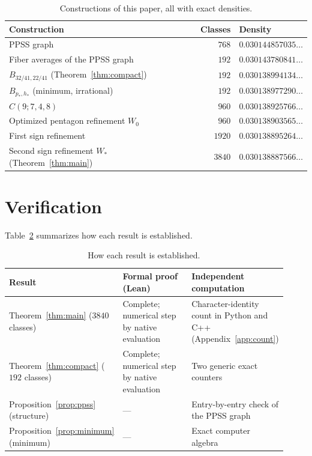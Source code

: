 \documentclass[11pt]{article}
\theoremstyle{definition}
\theoremstyle{remark}
\begin{document}
\begin{table}[tbp]
\centering
\caption{Constructions of this paper, all with exact densities.}
\label{tab:values}
\begin{tabular}{@{}lrl@{}}
\toprule
Construction & Classes & Density\\
\midrule
PPSS graph~\cite{ppss2025} & $768$ & $0.030144857035\ldots$\\
Fiber averages of the PPSS graph & $192$ & $0.030143780841\ldots$\\
$B_{32/41,22/41}$ (Theorem~\ref{thm:compact}) & $192$ & $0.030138994134\ldots$\\
$B_{p_*,h_*}$ (minimum, irrational) & $192$ & $0.030138977290\ldots$\\
$C(9;7,4,8)$ & $960$ & $0.030138925766\ldots$\\
Optimized pentagon refinement $W_0$ & $960$ & $0.030138903565\ldots$\\
First sign refinement & $1920$ & $0.030138895264\ldots$\\
Second sign refinement $W_*$ (Theorem~\ref{thm:main}) & $3840$ & $0.030138887566\ldots$\\
\bottomrule
\end{tabular}
\end{table}

\section{Verification}
\label{sec:verify}

Table~\ref{tab:verify} summarizes how each result is established.

\begin{table}[tbp]
\centering
\caption{How each result is established.}
\label{tab:verify}
\begin{tabular}{@{}p{0.27\linewidth}p{0.33\linewidth}p{0.32\linewidth}@{}}
\toprule
Result & Formal proof (Lean) & Independent computation\\
\midrule
Theorem~\ref{thm:main} ($3840$ classes) & Complete; numerical step by native evaluation & Character-identity count in Python and C++ (Appendix~\ref{app:count})\\
Theorem~\ref{thm:compact} ($192$ classes) & Complete; numerical step by native evaluation & Two generic exact counters\\
Proposition~\ref{prop:ppss} (structure) & --- & Entry-by-entry check of the PPSS graph\\
Proposition~\ref{prop:minimum} (minimum) & --- & Exact computer algebra\\
\bottomrule
\end{tabular}
\end{table}
\end{document}
